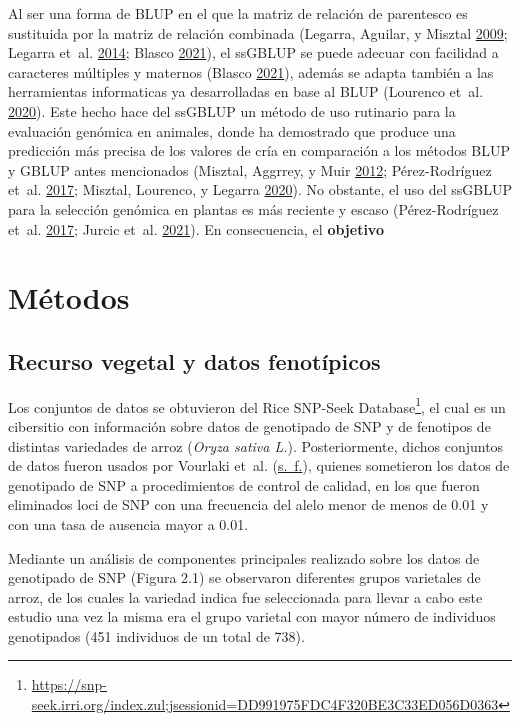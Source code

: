\documentclass[11pt,spanish,a4paper,oneside,]{book} %
\renewcommand{\href}[2]{#2\footnote{\url{#1}}}
\let\rmarkdownfootnote\footnote%
\def\footnote{\protect\rmarkdownfootnote}
\begin{document}
Al ser una forma de BLUP en el que la matriz de relación de parentesco es sustituida por la matriz de relación combinada (Legarra, Aguilar, y Misztal \protect\hyperlink{ref-cite:17}{2009}; Legarra et~al. \protect\hyperlink{ref-cite:15}{2014}; Blasco \protect\hyperlink{ref-cite:21}{2021}), el ssGBLUP se puede adecuar con facilidad a caracteres múltiples y maternos (Blasco \protect\hyperlink{ref-cite:21}{2021}), además se adapta también a las herramientas informaticas ya desarrolladas en base al BLUP (Lourenco et~al. \protect\hyperlink{ref-cite:22}{2020}). Este hecho hace del ssGBLUP un método de uso rutinario para la evaluación genómica en animales, donde ha demostrado que produce una predicción más precisa de los valores de cría en comparación a los métodos BLUP y GBLUP antes mencionados (Misztal, Aggrrey, y Muir \protect\hyperlink{ref-cite:14}{2012}; Pérez-Rodríguez et~al. \protect\hyperlink{ref-cite:19}{2017}; Misztal, Lourenco, y Legarra \protect\hyperlink{ref-cite:18}{2020}). No obstante, el uso del ssGBLUP para la selección genómica en plantas es más reciente y escaso (Pérez-Rodríguez et~al. \protect\hyperlink{ref-cite:19}{2017}; Jurcic et~al. \protect\hyperlink{ref-cite:11}{2021}). En consecuencia, el \textbf{objetivo}

\hypertarget{methods2}{%
\section{Métodos}\label{methods2}}

\hypertarget{recurso-vegetal-y-datos-fenotuxedpicos}{%
\subsection{Recurso vegetal y datos fenotípicos}\label{recurso-vegetal-y-datos-fenotuxedpicos}}

Los conjuntos de datos se obtuvieron del \href{https://snp-seek.irri.org/index.zul;jsessionid=DD991975FDC4F320BE3C33ED056D0363}{Rice SNP-Seek Database}, el cual es un cibersitio con información sobre datos de genotipado de SNP y de fenotipos de distintas variedades de arroz (\emph{Oryza sativa L.}). Posteriormente, dichos conjuntos de datos fueron usados por Vourlaki et~al. (\protect\hyperlink{ref-cite:26}{s.~f.}), quienes sometieron los datos de genotipado de SNP a procedimientos de control de calidad, en los que fueron eliminados loci de SNP con una frecuencia del alelo menor de menos de 0.01 y con una tasa de ausencia mayor a 0.01.

Mediante un análisis de componentes principales realizado sobre los datos de genotipado de SNP (Figura 2.1) se observaron diferentes grupos varietales de arroz, de los cuales la variedad indica fue seleccionada para llevar a cabo este estudio una vez la misma era el grupo varietal con mayor número de individuos genotipados (451 individuos de un total de 738).
\end{document}
